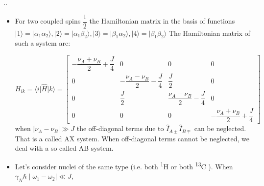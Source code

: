 \documentclass{beamer}
\begin{document}
\begin{frame}{\thesection.\thesubsection. \insertsubsection}
	\begin{itemize}[<+>]
		\item 
		For two coupled spins $\dfrac{1}{2}$ the Hamiltonian matrix in the basis of functions $\vert 1 \rangle =  \vert \alpha_1 \alpha_2 \rangle, \vert 2 \rangle =  \vert \alpha_1 \beta_2 \rangle, \vert 3 \rangle =  \vert \beta_1 \alpha_2 \rangle, \vert 4 \rangle =  \vert \beta_1 \beta_2 \rangle$
		The Hamiltonian matrix of such a system are:
		
		{\tiny
		\begin{equation}
		  H_{ik}= \langle i \vert \hat{H} \vert k \rangle = 
		   \begin{bmatrix}
                 -\dfrac{\nu_A+ \nu_{B}  }{2} + \dfrac{J}{4}   & 0 & 0 & 0 \\
                 0 & -\dfrac{\nu_A-\nu_B}{2} - \dfrac{J}{4}  & \dfrac{J}{2} & 0 \\
                 0 & \dfrac{J}{2} & \dfrac{\nu_A-\nu_B}{2} - \dfrac{J}{4}  & 0 \\
                 0 & 0 & 0 & -\dfrac{\nu_A+\nu_B}{2} + \dfrac{J}{4}                  
		   \end{bmatrix}
		\end{equation}
	    }%
	    when $\mid \nu_A -\nu_B \mid \gg J $ the off-diagonal terms due to $\hat{I}_{A\pm} \hat{I}_{B\mp}$ can be neglected. That is a called \alert{AX system}. When off-diagonal terms cannot be neglected, we deal with a so called \alert{AB system}.
	
		\item 
		
		Let's consider nuclei of the same type (i.e. both \textsuperscript{1}H or both \textsuperscript{13}C ). When $\gamma_N \hbar \mid \omega_1 -\omega_2 \mid \ll J $,
		
	\end{itemize}
	
	
\end{frame}
\end{document}
